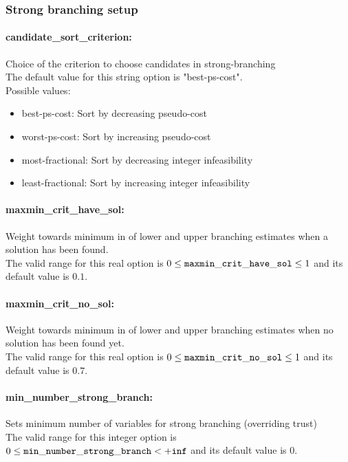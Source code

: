 \subsubsection{Strong branching setup}
\label{sec:Strong_branching_setup}

\paragraph{candidate\_sort\_criterion:}\label{sec:candidate_sort_criterion} Choice of the criterion to choose candidates in strong-branching $\;$ \\
The default value for this string option is "best-ps-cost".
\\ 
Possible values:
\begin{itemize}
   \item best-ps-cost: Sort by decreasing pseudo-cost
   \item worst-ps-cost: Sort by increasing pseudo-cost
   \item most-fractional: Sort by decreasing integer infeasibility
   \item least-fractional: Sort by increasing integer infeasibility
\end{itemize}

\paragraph{maxmin\_crit\_have\_sol:}\label{sec:maxmin_crit_have_sol} Weight towards minimum in of lower and upper branching estimates when a solution has been found. $\;$ \\
 The valid range for this real option is 
$0 \le {\tt maxmin\_crit\_have\_sol } \le 1$
and its default value is $0.1$.


\paragraph{maxmin\_crit\_no\_sol:}\label{sec:maxmin_crit_no_sol} Weight towards minimum in of lower and upper branching estimates when no solution has been found yet. $\;$ \\
 The valid range for this real option is 
$0 \le {\tt maxmin\_crit\_no\_sol } \le 1$
and its default value is $0.7$.


\paragraph{min\_number\_strong\_branch:}\label{sec:min_number_strong_branch} Sets minimum number of variables for strong branching (overriding trust) $\;$ \\
 The valid range for this integer option is
$0 \le {\tt min\_number\_strong\_branch } <  {\tt +inf}$
and its default value is $0$.


